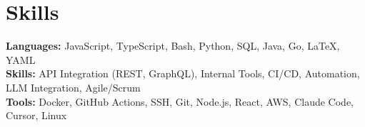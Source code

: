 \documentclass[11pt]{article}       %
\begin{document}

\vspace{-18.5pt}

\section*{Skills}
\textbf{Languages:} JavaScript, TypeScript, Bash, Python, SQL, Java, Go, LaTeX, YAML\\
\textbf{Skills:} API Integration (REST, GraphQL), Internal Tools, CI/CD, Automation, LLM Integration, Agile/Scrum\\
\textbf{Tools:} Docker, GitHub Actions, SSH, Git, Node.js, React, AWS, Claude Code, Cursor, Linux\\

\vspace{-6.5pt}
\end{document}
